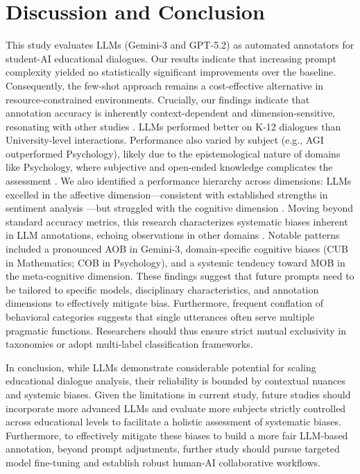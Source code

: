 \documentclass[runningheads]{llncs}
\begin{document}
\section{Discussion and Conclusion}
This study evaluates LLMs (Gemini-3 and GPT-5.2) as automated annotators for student-AI educational dialogues. Our results indicate that increasing prompt complexity yielded no statistically significant improvements over the baseline. Consequently, the few-shot approach remains a cost-effective alternative in resource-constrained environments. Crucially, our findings indicate that annotation accuracy is inherently context-dependent and dimension-sensitive, resonating with other studies \cite{jiang2025uncovering}. LLMs performed better on K-12 dialogues than University-level interactions. Performance also varied by subject (e.g., AGI outperformed Psychology), likely due to the epistemological nature of domains like Psychology, where subjective and open-ended knowledge complicates the assessment \cite{zheng2023judging}. We also identified a performance hierarchy across dimensions: LLMs excelled in the affective dimension—consistent with established strengths in sentiment analysis \cite{annan2025evaluating}—but struggled with the cognitive dimension \cite{long2024evaluating,he2025automated}. Moving beyond standard accuracy metrics, this research characterizes systematic biases inherent in LLM annotations, echoing observations in other domains \cite{lin-etal-2025-investigating,echterhoff-etal-2024-cognitive}. Notable patterns included a pronounced AOB in Gemini-3, domain-specific cognitive biases (CUB in Mathematics; COB in Psychology), and a systemic tendency toward MOB in the meta-cognitive dimension. These findings suggest that future prompts need to be tailored to specific models, disciplinary characteristics, and annotation dimensions to effectively mitigate bias. Furthermore, frequent conflation of behavioral categories suggests that single utterances often serve multiple pragmatic functions. Researchers should thus ensure strict mutual exclusivity in taxonomies or adopt multi-label classification frameworks.


In conclusion, while LLMs demonstrate considerable potential for scaling educational dialogue analysis, their reliability is bounded by contextual nuances and systemic biases. Given the limitations in current study, future studies should incorporate more advanced LLMs and evaluate more subjects strictly controlled across educational levels to facilitate a holistic assessment of systematic biases. Furthermore, to effectively mitigate these biases to build a more fair LLM-based annotation, beyond  prompt adjustments, further study should pursue targeted model fine-tuning and establish robust human-AI collaborative workflows.
\end{document}
